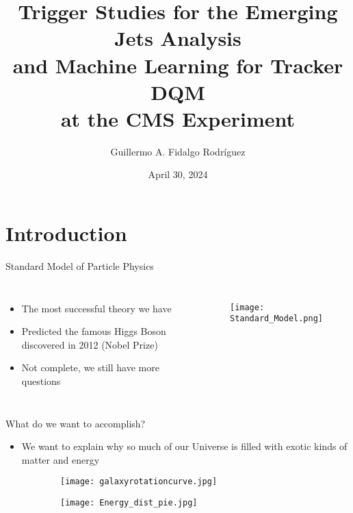 \documentclass[aspectratio=1610]{beamer}
\title[EMJ and ML4TkDQM]{Trigger Studies for the Emerging Jets Analysis \\and Machine Learning for Tracker DQM \\at the CMS Experiment}
\author[GAFR]{Guillermo A. Fidalgo Rodríguez}
\institute[UPRM]{University of Puerto Rico -- Mayagüez}
\date{April 30, 2024}
\begin{document}
\maketitle

\begin{frame}
	\tableofcontents
\end{frame}

\section{Introduction}

\begin{frame}{Standard Model of Particle Physics}
	\begin{columns}

		\begin{itemize}
			\item The most successful theory we have
			      \vspace*{1cm}
			\item Predicted the famous Higgs Boson discovered in 2012 (Nobel Prize)
			      \vspace{1cm}
			\item Not complete, we still have more questions
		\end{itemize}
		\begin{figure}
			\texttt{[image: Standard\_Model.png]}
		\end{figure}
	\end{columns}
\end{frame}

\begin{frame}{What do we want to accomplish?}
	\begin{itemize}
		\item We want to explain why so much of our Universe is filled with exotic kinds of matter and energy
	\end{itemize}
	\begin{figure}
		\centering
		\begin{subfigure}{0.45\linewidth}
			\texttt{[image: galaxyrotationcurve.jpg]}
		\end{subfigure}
		\begin{subfigure}{0.45\linewidth}
			\texttt{[image: Energy\_dist\_pie.jpg]}
		\end{subfigure}
	\end{figure}
\end{frame}
\end{document}
